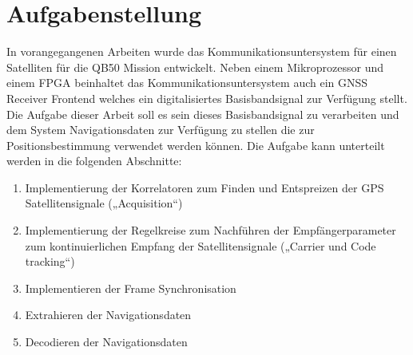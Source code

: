 \chapter*{Aufgabenstellung}
In vorangegangenen Arbeiten wurde das Kommunikationsuntersystem für einen Satelliten für die QB50 Mission entwickelt. Neben einem Mikroprozessor und einem FPGA beinhaltet das Kommunikationsuntersystem auch ein GNSS Receiver Frontend welches ein digitalisiertes Basisbandsignal zur Verfügung stellt. Die Aufgabe dieser Arbeit soll es sein dieses Basisbandsignal zu verarbeiten und dem System Navigationsdaten zur Verfügung zu stellen die zur Positionsbestimmung verwendet werden können.
Die Aufgabe kann unterteilt werden in die folgenden Abschnitte:
\begin{enumerate}
    \item Implementierung der Korrelatoren zum Finden und Entspreizen der GPS Satellitensignale („Acquisition“)
    \item Implementierung der Regelkreise zum Nachführen der Empfängerparameter zum kontinuierlichen Empfang der Satellitensignale („Carrier und Code tracking“)
    \item Implementieren der Frame Synchronisation 
    \item Extrahieren der Navigationsdaten
    \item Decodieren der Navigationsdaten
\end{enumerate}